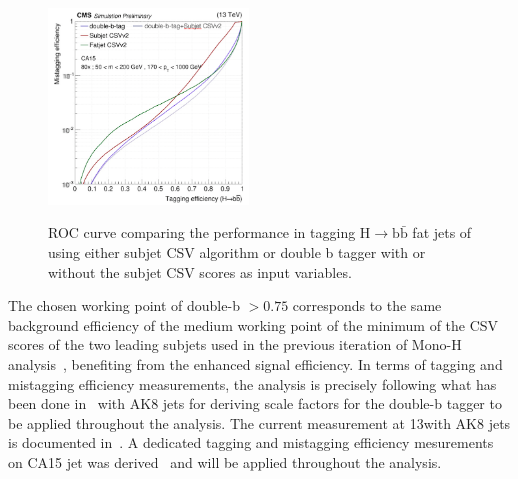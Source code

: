 \begin{figure}
  \centering
  \includegraphics[width=0.475\textwidth]{figures/higgstagging/doubleb/doubleb_roc_split.png}\\
  \caption{ROC curve comparing the performance in tagging $\text{H}\to\text{b}\bar{\text{b}}$ fat jets of using either subjet CSV algorithm or double b tagger with or without the subjet CSV scores as input variables.}
  \label{fig:doublebroc}
\end{figure}

The chosen working point of double-b $> 0.75$ corresponds to the same background efficiency of the medium working point of the minimum of the CSV scores of the two leading subjets used in the previous iteration of Mono-H  analysis~\cite{CMS_AN_2016-219}, benefiting from the enhanced signal efficiency.
In terms of tagging and mistagging efficiency measurements, the analysis is precisely following what has been done in~\cite{CMS-PAS-BTV-15-002} with AK8 jets for deriving scale factors for the double-b tagger to be applied throughout the analysis. The current measurement at 13\TeV with AK8 jets is documented in~\cite{Ref:BTAG2016}. A dedicated tagging and mistagging efficiency mesurements on CA15 jet was derived~\cite{CMS_AN_2016-219} and will be applied throughout the analysis.



